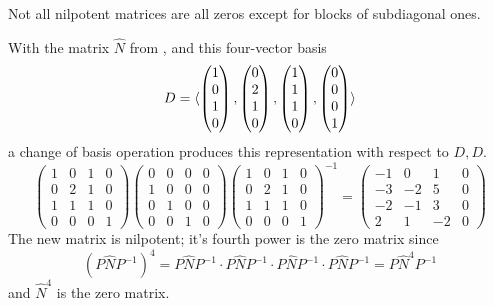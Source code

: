Not all nilpotent matrices are all zeros except for blocks of
subdiagonal ones.

\begin{example} \label{ex:NilMatNotCanon}
With the matrix $\hat{N}$ from ,
and this four-vector basis
\begin{equation*}
  D=\langle\begin{pmatrix} 1 \\ 0 \\ 1 \\ 0 \end{pmatrix},
              \begin{pmatrix} 0 \\ 2 \\ 1 \\ 0 \end{pmatrix},
              \begin{pmatrix} 1 \\ 1 \\ 1 \\ 0 \end{pmatrix},
              \begin{pmatrix} 0 \\ 0 \\ 0 \\ 1 \end{pmatrix}\rangle
\end{equation*}
a change of basis operation 
produces this representation with respect to \( D,D \).
\begin{equation*}
  \begin{pmatrix}
    1  &0  &1 &0 \\
    0  &2  &1 &0 \\
    1  &1  &1 &0 \\
    0  &0  &0 &1
  \end{pmatrix}
  \begin{pmatrix}
    0  &0  &0 &0 \\
    1  &0  &0 &0 \\
    0  &1  &0 &0 \\
    0  &0  &1 &0
  \end{pmatrix}
  \begin{pmatrix}
    1  &0  &1 &0 \\
    0  &2  &1 &0 \\
    1  &1  &1 &0 \\
    0  &0  &0 &1
  \end{pmatrix}^{-1}\!\!
  =
  \begin{pmatrix}
   -1  &0  &1   &0 \\
   -3  &-2 &5   &0 \\
   -2  &-1  &3  &0 \\
    2  &1   &-2 &0
  \end{pmatrix}
\end{equation*}
The new matrix is nilpotent; it's fourth power 
is the zero matrix since
\begin{equation*}
   (P\hat{N}P^{-1})^4
   =P\hat{N}P^{-1}\cdot P\hat{N}P^{-1}\cdot P\hat{N}P^{-1}\cdot P\hat{N}P^{-1}
   =P\hat{N}^4P^{-1}
\end{equation*}
and \( \hat{N}^4 \) is the zero matrix.
\end{example}

